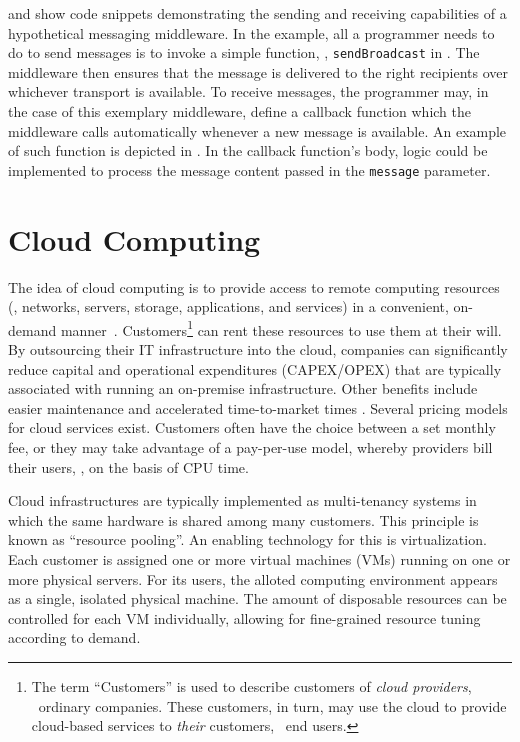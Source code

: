  and  show code snippets demonstrating the sending and receiving capabilities of a hypothetical messaging middleware. In the example, all a programmer needs to do to send messages is to invoke a simple function, \eg , \texttt{sendBroadcast} in . The middleware then ensures that the message is delivered to the right recipients over whichever transport is available. To receive messages, the programmer may, in the case of this exemplary middleware, define a callback function which the middleware calls automatically whenever a new message is available. An example of such function is depicted in . In the callback function's body, logic could be implemented to process the message content passed in the \texttt{message} parameter.

%
%
%
%
%
%
%
%
%
%

\section{Cloud Computing}

The idea of cloud computing is to provide access to remote computing resources  (\eg , networks, servers, storage, applications, and services) in a convenient, on-demand manner~\cite{mell2011nist}. Customers\footnote{The term ``Customers'' is used to describe customers of \emph{cloud providers}, \ie\ ordinary companies. These customers, in turn, may use the cloud to provide cloud-based services to \emph{their} customers, \ie\ end users.} can rent these resources to use them at their will. By outsourcing their IT infrastructure into the cloud, companies can significantly reduce capital and operational expenditures (CAPEX/OPEX) that are typically associated with running an on-premise infrastructure. Other benefits include easier maintenance and accelerated time-to-market times \cite{armbrust2010view}. Several pricing models for cloud services exist. Customers often have the choice between a set monthly fee, or they may take advantage of a pay-per-use model, whereby providers bill their users, \eg , on the basis of CPU time.

Cloud infrastructures are typically implemented as multi-tenancy systems in which the same hardware is shared among many customers. This principle is known as ``resource pooling''. An enabling technology for this is virtualization. Each customer is assigned one or more virtual machines (VMs) running on one or more physical servers. For its users, the alloted computing environment appears as a single, isolated physical machine. The amount of disposable resources can be controlled for each VM individually, allowing for fine-grained resource tuning according to demand.

